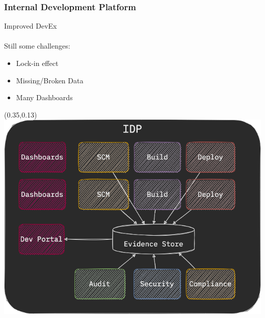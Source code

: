 \documentclass[aspectratio=169,11pt,hyperref={colorlinks=true}]{beamer}
\begin{document}
\begin{blackframe}
  \frametitle{Internal Development Platform}
  Improved DevEx \\
  ~\\
  Still some challenges:
  \begin{itemize}
    \item Lock-in effect
    \item Missing/Broken Data
    \item Many Dashboards
  \end{itemize}
  \begin{textblock*}{0.60\paperwidth}(0.35\paperwidth,0.13\paperheight)
    \includegraphics[width=0.60\paperwidth]{img/cdevents-idp-multiple.png}
  \end{textblock*}
\end{blackframe}
\end{document}
